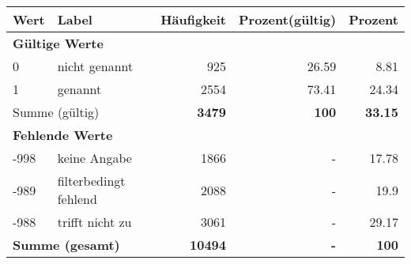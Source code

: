      \begin{longtable}{lXrrr}
     \toprule
     \textbf{Wert} & \textbf{Label} & \textbf{Häufigkeit} & \textbf{Prozent(gültig)} & \textbf{Prozent} \\
     \endhead
     \midrule
     \multicolumn{5}{l}{\textbf{Gültige Werte}}\\

     0 &
     \multicolumn{1}{X}{ nicht genannt   } &


       \num{925} &
       \num[round-mode=places,round-precision=2]{26,59} &
         \num[round-mode=places,round-precision=2]{8,81} \\

     1 &
     \multicolumn{1}{X}{ genannt   } &


       \num{2554} &
       \num[round-mode=places,round-precision=2]{73,41} &
         \num[round-mode=places,round-precision=2]{24,34} \\
     \midrule
     \multicolumn{2}{l}{Summe (gültig)} &
       \textbf{\num{3479}} &
     \textbf{100} &
       \textbf{\num[round-mode=places,round-precision=2]{33,15}} \\
     \multicolumn{5}{l}{\textbf{Fehlende Werte}}\\
       -998 &
       keine Angabe &
         \num{1866} &
        - &
         \num[round-mode=places,round-precision=2]{17,78} \\
       -989 &
       filterbedingt fehlend &
         \num{2088} &
        - &
         \num[round-mode=places,round-precision=2]{19,9} \\
       -988 &
       trifft nicht zu &
         \num{3061} &
        - &
         \num[round-mode=places,round-precision=2]{29,17} \\
     \midrule
     \multicolumn{2}{l}{\textbf{Summe (gesamt)}} &
          \textbf{\num{10494}} &
        \textbf{-} &
        \textbf{100} \\
     \bottomrule
     \end{longtable}
     
